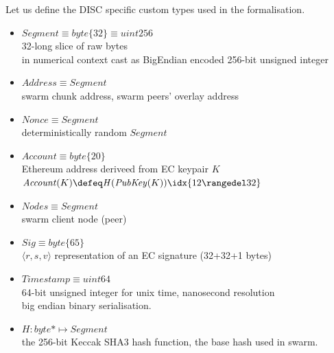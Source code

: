 \begin{definition}
Let us define the  DISC specific custom types used in the formalisation.
\begin{itemize}[noitemsep,leftmargin=0pt]
\item[] $\mathit{Segment}\equiv\mathit{byte}\{32\}\equiv\mathit{uint256}$\\\hspace*{1em}
    32-long slice of raw bytes\\\hspace*{1em}
    in numerical context cast as BigEndian encoded 256-bit unsigned integer 
\item[]  $\mathit{Address} \equiv \mathit{Segment}$\\\hspace*{1em}
    swarm chunk address, swarm peers' overlay address
\item[] $\mathit{Nonce} \equiv \mathit{Segment}$\\\hspace*{1em}
    deterministically random $\mathit{Segment}$
\item[]$\mathit{Account}\equiv \mathit{byte}\{20\}$\\\hspace*{1em}
    Ethereum address deriveed from EC keypair $K$\\\hspace*{1em}
    $\mathit{Account}(K)\defeq\mathit{H}(\mathit{PubKey}(K))\idx{12\rangedel32}$
\item[] $\mathit{Nodes} \equiv \mathit{Segment}$\\\hspace*{1em}
    swarm client node (peer)
\item[]$\mathit{Sig} \equiv \mathit{byte}\{65\}$\\\hspace*{1em}
$\langle r,s,v\rangle$ representation of an EC signature (32+32+1
bytes)
\item[] $\mathit{Timestamp}\equiv\mathit{uint64}$\\\hspace*{1em}
    64-bit unsigned integer for unix time, nanosecond resolution\\\hspace*{1em} 
    big endian binary serialisation.
\item[] $\mathit{H}:\mathit{byte}{*}\mapsto             \mathit{Segment}$\\\hspace*{1em}
the 256-bit Keccak SHA3 hash function, the base hash used in swarm.
\end{itemize}
\end{definition}

